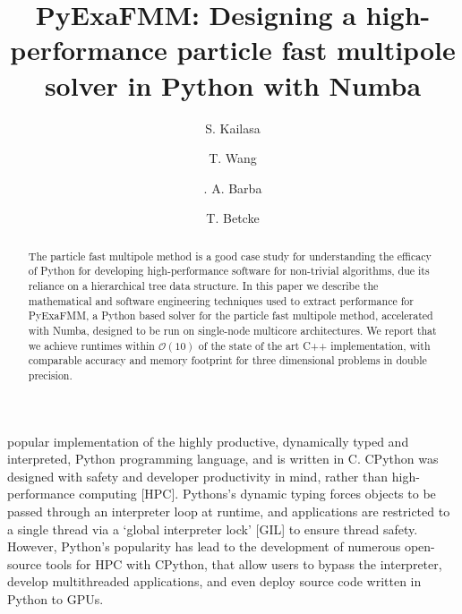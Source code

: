 \documentclass{IEEEcsmag}
\begin{document}

\title{PyExaFMM: Designing a high-performance particle fast multipole solver in Python with Numba}

\author{S. Kailasa}

\author{T. Wang}

\author{. A. Barba}

\author{T. Betcke}


\begin{abstract}
The particle fast multipole method is a good case study for understanding the efficacy of Python for developing high-performance software for non-trivial algorithms, due its reliance on a hierarchical tree data structure. In this paper we describe the mathematical and software engineering techniques used to extract performance for PyExaFMM, a Python based solver for the particle fast multipole method, accelerated with Numba, designed to be run on single-node multicore architectures. We report that we achieve runtimes within $\mathcal{O}(10)$ of the state of the art C++ implementation, with comparable accuracy and memory footprint for three dimensional problems in double precision.
\end{abstract}

\maketitle
{} popular implementation of the highly productive, dynamically typed and interpreted, Python programming language, and is written in C. CPython was designed with safety and developer productivity in mind, rather than high-performance computing [HPC]. Pythons's dynamic typing forces objects to be passed through an interpreter loop at runtime, and applications are restricted to a single thread via a `global interpreter lock' [GIL] to ensure thread safety. However, Python's popularity has lead to the development of numerous open-source tools for HPC with CPython, that allow users to bypass the interpreter, develop multithreaded applications, and even deploy source code written in Python to GPUs.
\end{document}
